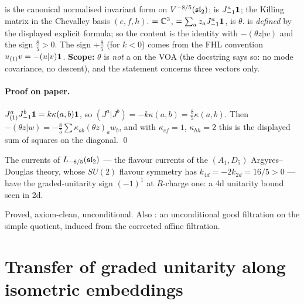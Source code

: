 \begin{dictionary}
 is the canonical normalised invariant form on $V^{-8/5}(\mathfrak{sl}_2)$;
 is $J^a_{-1}\mathbf{1}$;  the Killing matrix in the Chevalley basis
$(e,f,h)$.  $={\mathbb{C}}^3$,  $= \sum_az_aJ^a_{-1}\mathbf{1}$,
 is $\theta$.  is \emph{defined} by the displayed
explicit formula; so the content is the identity with $-(\theta z|w)$ and the sign $\tfrac85>0$. The sign
$+\tfrac85$ (for $k<0$) comes from the FHL convention $u_{(1)}v = -(u|v)\mathbf{1}$. \textbf{Scope:} $\theta$ is
\emph{not} a  on the VOA (the docstring says so: no mode covariance, no descent), and the
statement concerns three vectors only.
\end{dictionary}

\paragraph{Proof on paper.} $J^a_{(1)}J^b_{-1}\mathbf{1} = k\kappa(a,b)\mathbf{1}$, so $(J^a|J^b) = -k\kappa(a,b) =
\tfrac85\kappa(a,b)$. Then $-(\theta z|w) = -\tfrac85\sum\kappa_{ab}(\theta z)_aw_b$, and with $\kappa_{ef} = 1$,
$\kappa_{hh} = 2$ this is the displayed sum of squares on the diagonal. \qed

\begin{physics}
The currents of $L_{-8/5}(\mathfrak{sl}_2)$ --- the flavour currents of the $(A_1,D_5)$ Argyres--Douglas theory, whose
$SU(2)$ flavour symmetry has $k_{4d} = -2k_{2d} = 16/5>0$ --- have the graded-unitarity sign $(-1)^1$ at
$R$-charge one: a 4d unitarity bound seen in 2d.
\end{physics}

\begin{status}
Proved, axiom-clean, unconditional. Also : an unconditional good
filtration on the simple quotient, induced from the corrected affine filtration.
\end{status}

\section{Transfer of graded unitarity along isometric embeddings}\label{l19:sec:transfer}

